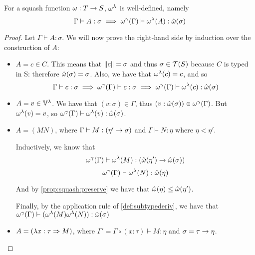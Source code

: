 \documentclass[main.tex]{subfiles}
\begin{document}
\begin{prop}
    For a squash function $\omega: T \rightarrow S$, $\omega^{\lambda}$ is
    well-defined, namely
    \[ \Gamma \vdash A : \sigma \implies
        \omega^{\gamma}(\Gamma) \vdash \omega^{\lambda}(A) : \hat{\omega}(\sigma) \]
\end{prop}
\begin{proof}
    Let $\Gamma \vdash A : \sigma$. We will now prove the right-hand side
    by induction over the construction of $A$:
    \begin{itemize}
        \item $A = c \in C$. This means that $\|c\| = \sigma$ and thus
            $\sigma \in \mathcal{T}( S )$ because $C$ is typed in S: therefore
            $\hat{\omega}(\sigma) = \sigma$. Also, we have that $\omega^{\lambda}(c) = c$,
            and so \[ \Gamma \vdash c : \sigma \implies
                \omega^{\gamma}(\Gamma) \vdash c : \sigma \implies
                \omega^{\gamma}(\Gamma) \vdash \omega^{\lambda}(c) : \hat{\omega}(\sigma) \]

        \item $A = v \in \mathbb{V}^{\lambda}$. We have that $(v : \sigma) \in \Gamma$, thus
            $(v : \hat{\omega}(\sigma)) \in \omega^{\gamma}(\Gamma)$. But $\omega^{\lambda}(v) = v$,
            so $\omega^{\gamma}(\Gamma) \vdash \omega^{\lambda}(v) : \hat{\omega}(\sigma)$.

        \item $A = (MN)$, where $\Gamma \vdash M : (\eta' \rightarrow \sigma)$
            and $\Gamma \vdash N : \eta$ where $\eta \less \eta'$.

            Inductively, we know that
            \begin{equation}
                \omega^{\gamma}(\Gamma) \vdash \omega^{\lambda}(M) : (\hat{\omega}(\eta')
                    \rightarrow \hat{\omega}(\sigma))
            \end{equation}
            \begin{equation}
                \omega^{\gamma}(\Gamma) \vdash \omega^{\lambda}(N) : \hat{\omega}(\eta)
            \end{equation}

            And by \cref{prop:squash:preserve} we have that $\hat{\omega}(\eta)
                \leq \hat{\omega}(\eta')$.

            Finally, by the application rule of \cref{def:subtypederiv},
            we have that $\omega^{\gamma}(\Gamma) \vdash (\omega^{\lambda}(M) \omega^{\lambda}(N))
            : \hat{\omega}(\sigma) $

        \item $A = (\lambda x : \tau \Rightarrow M)$, where $\Gamma' = \Gamma \circ
            (x : \tau) \vdash M : \eta$ and $\sigma = \tau \rightarrow \eta$.


\end{itemize}
\end{proof}
\end{document}
